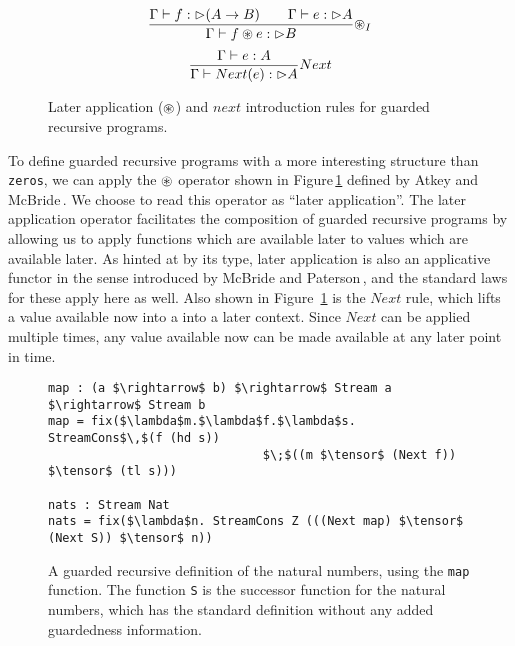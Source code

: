 \begin{figure}
\[
\frac { \Gamma \vdash f: \rhd (A\rightarrow B)\quad \quad \Gamma \vdash e : \rhd A }{ \Gamma \vdash f \circledast e : \rhd B } { \circledast }_{ I }
\]
\[
\frac { \Gamma \vdash e:A }{ \Gamma \vdash Next(e):{ \rhd A } } Next
\]
\caption{Later application ($\circledast$) and $next$ introduction rules for guarded recursive programs.}
\label{fig:guarded_recursion_rules}
\end{figure}
To define guarded recursive programs with a more interesting structure than
\texttt{zeros}, we can apply the $\circledast$ operator shown in
Figure\,\ref{fig:guarded_recursion_rules} defined by Atkey and
McBride\,\citep{Atkey:2013}. We choose to read this operator as ``later
application''.  The later application operator facilitates the composition of
guarded recursive programs by allowing us to apply functions which are available
later to values which are available later. As hinted at by its type, later
application is also an applicative functor in the sense introduced by McBride
and Paterson\,\citep{Mcbride:2008}, and the standard laws for these apply here
as well. Also shown in Figure~\ref{fig:guarded_recursion_rules} is the $Next$
rule, which lifts a value available now into a into a later context. Since
$Next$ can be applied multiple times, any value available now can be made
available at any later point in time.


\begin{figure}
\begin{lstlisting}[mathescape]
map : (a $\rightarrow$ b) $\rightarrow$ Stream a $\rightarrow$ Stream b
map = fix($\lambda$m.$\lambda$f.$\lambda$s. StreamCons$\,$(f (hd s)) 
                              $\;$((m $\tensor$ (Next f)) $\tensor$ (tl s)))

nats : Stream Nat
nats = fix($\lambda$n. StreamCons Z (((Next map) $\tensor$ (Next S)) $\tensor$ n))
\end{lstlisting}
%
\caption{A guarded recursive definition of the natural numbers, using the \texttt{map} function. The function \texttt{S} is the successor function for the natural numbers, which has the standard definition without any added guardedness information.}
\label{fig:guarded_recursion_nats}
\end{figure}

